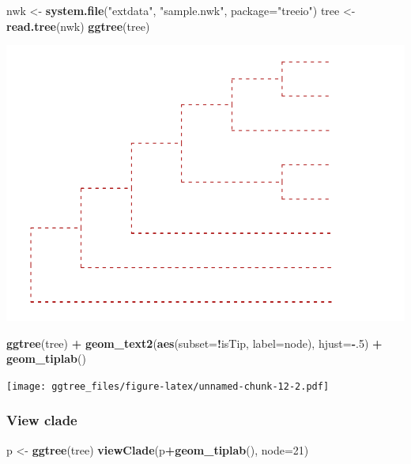 \documentclass[]{article}
\newenvironment{Shaded}{\begin{snugshade}}{\end{snugshade}}
\newcommand{\KeywordTok}[1]{\textcolor[rgb]{0.13,0.29,0.53}{\textbf{#1}}}
\newcommand{\DataTypeTok}[1]{\textcolor[rgb]{0.13,0.29,0.53}{#1}}
\newcommand{\DecValTok}[1]{\textcolor[rgb]{0.00,0.00,0.81}{#1}}
\newcommand{\StringTok}[1]{\textcolor[rgb]{0.31,0.60,0.02}{#1}}
\newcommand{\OperatorTok}[1]{\textcolor[rgb]{0.81,0.36,0.00}{\textbf{#1}}}
\newcommand{\NormalTok}[1]{#1}
\begin{document}
\begin{Shaded}
\begin{Highlighting}[]
\NormalTok{nwk <-}\StringTok{ }\KeywordTok{system.file}\NormalTok{(}\StringTok{"extdata"}\NormalTok{, }\StringTok{"sample.nwk"}\NormalTok{, }\DataTypeTok{package=}\StringTok{"treeio"}\NormalTok{)}
\NormalTok{tree <-}\StringTok{ }\KeywordTok{read.tree}\NormalTok{(nwk)}
\KeywordTok{ggtree}\NormalTok{(tree)}
\end{Highlighting}
\end{Shaded}

\includegraphics{ggtree_files/figure-latex/unnamed-chunk-12-1.pdf}

\begin{Shaded}
\begin{Highlighting}[]
\KeywordTok{ggtree}\NormalTok{(tree) }\OperatorTok{+}\StringTok{ }\KeywordTok{geom_text2}\NormalTok{(}\KeywordTok{aes}\NormalTok{(}\DataTypeTok{subset=}\OperatorTok{!}\NormalTok{isTip, }\DataTypeTok{label=}\NormalTok{node), }\DataTypeTok{hjust=}\OperatorTok{-}\NormalTok{.}\DecValTok{5}\NormalTok{) }\OperatorTok{+}\StringTok{ }\KeywordTok{geom_tiplab}\NormalTok{()}
\end{Highlighting}
\end{Shaded}

\texttt{[image: ggtree\_files/figure-latex/unnamed-chunk-12-2.pdf]}

\subsubsection{View clade}\label{view-clade}

\begin{Shaded}
\begin{Highlighting}[]
\NormalTok{p <-}\StringTok{ }\KeywordTok{ggtree}\NormalTok{(tree)}
\KeywordTok{viewClade}\NormalTok{(p}\OperatorTok{+}\KeywordTok{geom_tiplab}\NormalTok{(), }\DataTypeTok{node=}\DecValTok{21}\NormalTok{)}
\end{Highlighting}
\end{Shaded}
\end{document}
